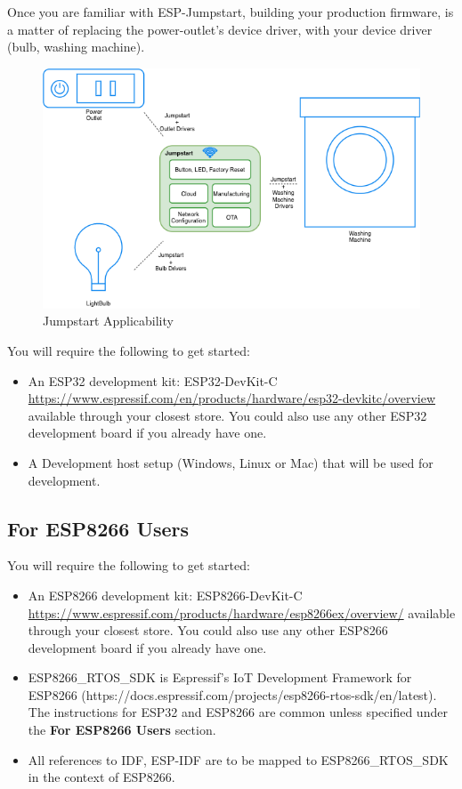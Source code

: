 \documentclass[main.tex]{subfiles}
\begin{document}
Once you are familiar with ESP-Jumpstart, building your production firmware, is a matter of replacing the power-outlet's device driver, with your device driver (bulb, washing machine).

\begin{figure}[h!]
    \centering
    \includegraphics[scale=0.7]{../../_static/jumpstart-outlet-blocks.png}
    \caption{Jumpstart Applicability}
    \label{fig:jumpstart_applicability}
\end{figure}

You will require the following to get started:
\begin{itemize}
\item An ESP32 development kit: ESP32-DevKit-C \url{https://www.espressif.com/en/products/hardware/esp32-devkitc/overview} available through your closest store. You could also use any other ESP32 development board if you already have one.
\item A Development host setup (Windows, Linux or Mac) that will be used for development.
\end{itemize}

\subsection{For ESP8266 Users}\label{sec:for_esp8266_users}
You will require the following to get started:
\begin{itemize}
\item An ESP8266 development kit: ESP8266-DevKit-C \url{https://www.espressif.com/products/hardware/esp8266ex/overview/} available through your closest store. You could also use any other ESP8266 development board if you already have one.
\item ESP8266\_RTOS\_SDK is Espressif’s IoT Development Framework for ESP8266 (https://docs.espressif.com/projects/esp8266-rtos-sdk/en/latest). The instructions for ESP32 and ESP8266 are common unless specified under the \textbf{For ESP8266 Users} section.
\item All references to IDF, ESP-IDF are to be mapped to ESP8266\_RTOS\_SDK in the context of ESP8266.
\end{itemize}
\end{document}
